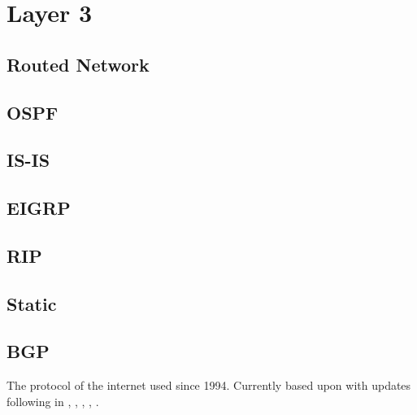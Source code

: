 \chapter{Layer 3}

\section{Routed Network}

\section{OSPF}
\section{IS-IS}
\section{EIGRP}
\section{RIP}
\section{Static}
\section{BGP}


The protocol of the internet used since 1994.\cite{wiki:Border_Gateway_Protocol}
Currently based upon  with updates following in  , , , , .



